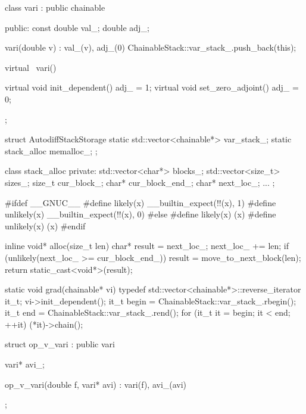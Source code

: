\documentclass[10pt]{report}
\begin{document}
%
\begin{stancode}
class vari : public chainable {
public:
  const double val_;
  double adj_;

  vari(double v) : val_(v), adj_(0) { 
    ChainableStack::var_stack_.push_back(this);
  }

  virtual ~vari() { }

  virtual void init_dependent() { adj_ = 1; }
  virtual void set_zero_adjoint() { adj_ = 0; }
};
\end{stancode}


%
\begin{stancode}
struct AutodiffStackStorage {
  static std::vector<chainable*> var_stack_;
  static stack_alloc memalloc_;
};

class stack_alloc {
private: 
  std::vector<char*> blocks_;
  std::vector<size_t> sizes_;
  size_t cur_block_;
  char* cur_block_end_;
  char* next_loc_;
  ...
};
\end{stancode}


%
\begin{stancode}
#ifdef __GNUC__
#define likely(x)      __builtin_expect(!!(x), 1)
#define unlikely(x)    __builtin_expect(!!(x), 0)
#else
#define likely(x)     (x)
#define unlikely(x)   (x)
#endif
\end{stancode}


%
\begin{stancode}
inline void* alloc(size_t len) {
  char* result = next_loc_;
  next_loc_ += len;
  if (unlikely(next_loc_ >= cur_block_end_))
    result = move_to_next_block(len);
  return static_cast<void*>(result);
}
\end{stancode}


%
\begin{stancode}
static void grad(chainable* vi) {
  typedef std::vector<chainable*>::reverse_iterator it_t;
  vi->init_dependent(); 
  it_t begin = ChainableStack::var_stack_.rbegin();
  it_t end = ChainableStack::var_stack_.rend();
  for (it_t it = begin; it < end; ++it)
    (*it)->chain();
}
\end{stancode}


%
\begin{stancode}
struct op_v_vari : public vari {
  vari* avi_;

  op_v_vari(double f, vari* avi) : vari(f), avi_(avi) { }
};
\end{stancode}
\end{document}
